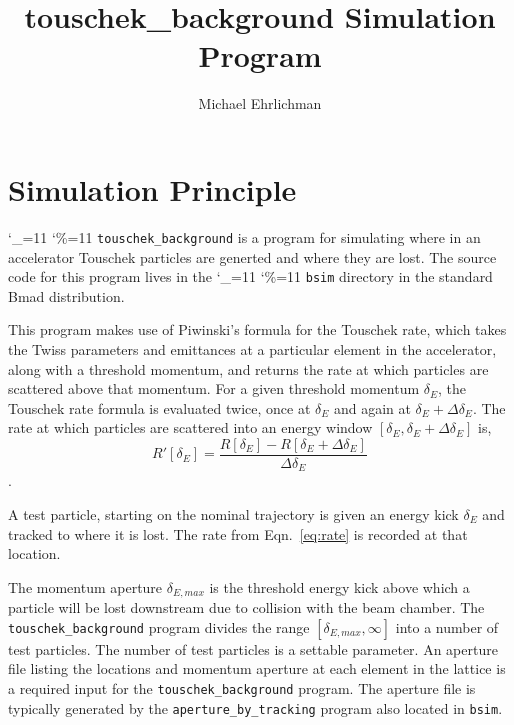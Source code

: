\documentclass[11pt]{article}
\title{touschek_background Simulation Program}
\author{Michael Ehrlichman}
\newcommand\ttcmd{\begingroup\catcode`\_=11 \catcode`\%=11 \dottcmd}
\newcommand\dottcmd[1]{\texttt{#1}\endgroup}
\newcommand{\vn}{\ttcmd}
\begin{document}
\maketitle


\section{Simulation Principle} 
\label{s:intro}

\vn{touschek_background} is a program for simulating where in an accelerator Touschek particles
are generted and where they are lost.
The source code for this program lives in the \vn{bsim} directory in
the standard Bmad\cite{b:bmad} distribution.

This program makes use of Piwinski's formula for the Touschek rate, which takes
the Twiss parameters and emittances at a particular element in the accelerator, along with a threshold momentum,
and returns the rate at which particles are scattered above that momentum\cite{ap:touschek}.
For a given threshold momentum $\delta_E$, the Touschek rate formula is evaluated twice,
once at $\delta_E$ and again at $\delta_E+\Delta\delta_E$.  The rate at which particles
are scattered into an energy window $\left[\delta_E,\delta_E+\Delta\delta_E\right]$
is,
\begin{equation}
R'\left[\delta_E\right]=\frac{R\left[\delta_E\right]-R\left[\delta_E+\Delta\delta_E\right]}
{\Delta\delta_E}
\label{eq:rate}
\end{equation}.

A test particle, starting on the nominal trajectory is given an energy kick $\delta_E$ and tracked
to where it is lost.  The rate from Eqn.~\ref{eq:rate} is recorded at that location.

The momentum aperture $\delta_{E,max}$ is the threshold energy kick above which a particle will be lost downstream
due to collision with the beam chamber.  The {\tt touschek_background} program divides the 
range $\left[\delta_{E,max},\infty\right]$ into a number of test particles.  The number of test particles
is a settable parameter.  An aperture file listing the locations and momentum aperture at
each element in the lattice is a required input for the {\tt touschek_background} program.  The aperture
file is typically generated by the {\tt aperture_by_tracking} program also located in {\tt bsim}.
\end{document}
